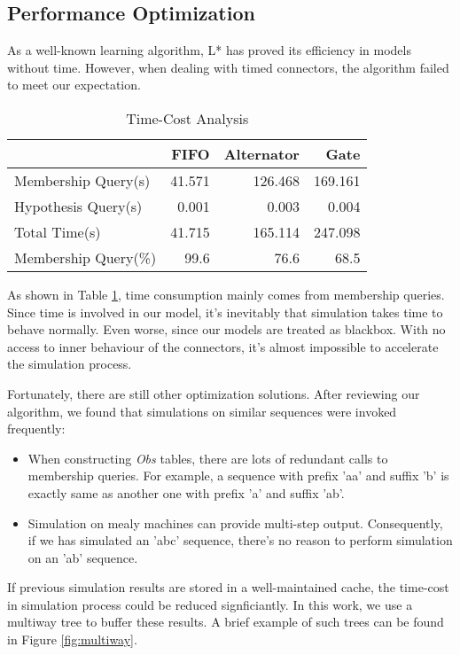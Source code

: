 \documentclass[conference, a4paper]{IEEEtran}
\begin{document}
\subsection{Performance Optimization}
As a well-known learning algorithm, L* has proved its efficiency in models without time.
However, when dealing with timed connectors, the algorithm failed to meet our expectation.

\begin{table}[h]
  \renewcommand{\arraystretch}{1.3}
  \caption{Time-Cost Analysis}
  \label{tabel:timecost}
  \centering
  \begin{tabular}{l||rrr}
    \hline
    & FIFO & Alternator & Gate \\
    \hline\hline
    Membership Query(s) & 41.571 & 126.468 & 169.161 \\
    Hypothesis Query(s) & 0.001 & 0.003 & 0.004 \\
    Total Time(s) & 41.715 & 165.114 & 247.098\\
    Membership Query(\%) & 99.6 & 76.6 & 68.5\\
    \hline
  \end{tabular}
\end{table}

As shown in Table \ref{tabel:timecost}, time consumption mainly comes from membership queries.
Since time is involved in our model, it's inevitably that simulation takes time to behave normally.
Even worse, since our models are treated as blackbox. With no access to inner behaviour of the
connectors, it's almost impossible to accelerate the simulation process.

Fortunately, there are still other optimization solutions. After reviewing our algorithm, we found
that simulations on similar sequences were invoked frequently:

\begin{itemize}
  \item When constructing \emph{Obs} tables, there are lots of redundant calls to membership
    queries. For example, a sequence with prefix 'aa' and suffix 'b' is exactly same as another one
    with prefix 'a' and suffix 'ab'.
  \item Simulation on mealy machines can provide multi-step output. Consequently, if we has
    simulated an 'abc' sequence, there's no reason to perform simulation on an 'ab' sequence.
\end{itemize}

If previous simulation results are stored in a well-maintained cache, the time-cost in
simulation process could be reduced signficiantly. In this work, we use a multiway tree to buffer
these results. A brief example of such trees can be found in Figure \ref{fig:multiway}.
\end{document}
